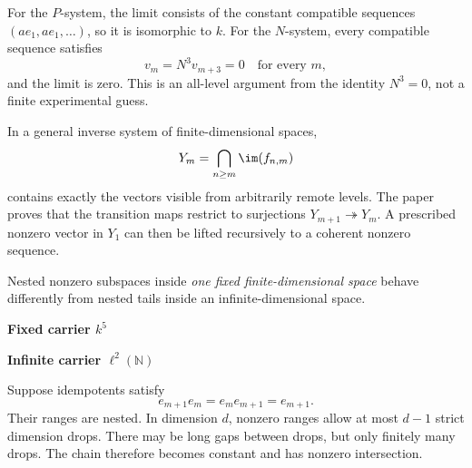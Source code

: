 For the $P$-system, the limit consists of the constant compatible sequences $(a e_1,a e_1,\ldots)$, so it is isomorphic to $k$. For the $N$-system, every compatible sequence satisfies
\[
v_m=N^3v_{m+3}=0\quad\text{for every }m,
\]
and the limit is zero. This is an all-level argument from the identity $N^3=0$, not a finite experimental guess.

In a general inverse system of finite-dimensional spaces,
\[
Y_m=\bigcap_{n\ge m}\im(f_{n,m})
\]
contains exactly the vectors visible from arbitrarily remote levels. The paper proves that the transition maps restrict to surjections $Y_{m+1}\twoheadrightarrow Y_m$. A prescribed nonzero vector in $Y_1$ can then be lifted recursively to a coherent nonzero sequence.


Nested nonzero subspaces inside \emph{one fixed finite-dimensional space} behave differently from nested tails inside an infinite-dimensional space.

\begin{minipage}[t]{.44\linewidth}\centering
{\sffamily\bfseries Fixed carrier $k^5$}\par\vspace{4pt}
\end{minipage}\hfill
\begin{minipage}[t]{.52\linewidth}\centering
{\sffamily\bfseries Infinite carrier $\ell^2(\mathbb N)$}\par\vspace{4pt}
\end{minipage}

Suppose idempotents satisfy
\[
e_{m+1}e_m=e_me_{m+1}=e_{m+1}.
\]
Their ranges are nested. In dimension $d$, nonzero ranges allow at most $d-1$ strict dimension drops. There may be long gaps between drops, but only finitely many drops. The chain therefore becomes constant and has nonzero intersection.

